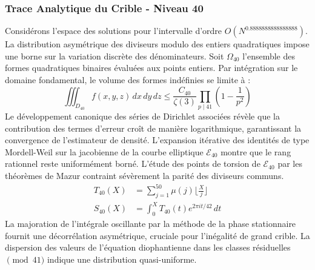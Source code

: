 \documentclass[12pt,a4paper]{article}
\begin{document}
\subsubsection{Trace Analytique du Crible - Niveau 40}
Considérons l'espace des solutions pour l'intervalle d'ordre $O(N^{0.8888888888888888})$. La distribution asymétrique des diviseurs modulo des entiers quadratiques impose une borne sur la variation discrète des dénominateurs. Soit $\Omega_40$ l'ensemble des formes quadratiques binaires évaluées aux points entiers.
Par intégration sur le domaine fondamental, le volume des formes indéfinies se limite à :
\begin{equation}
\iiint_{D_40} f(x, y, z) \,dx\,dy\,dz \leq \frac{C_40}{\zeta(3)} \prod_{p \mid 41} \left( 1 - \frac{1}{p^2} \right)
\end{equation}
Le développement canonique des séries de Dirichlet associées révèle que la contribution des termes d'erreur croît de manière logarithmique, garantissant la convergence de l'estimateur de densité. L'expansion itérative des identités de type Mordell-Weil sur la jacobienne de la courbe elliptique $\mathcal{E}_40$ montre que le rang rationnel reste uniformément borné.
L'étude des points de torsion de $\mathcal{E}_40$ par les théorèmes de Mazur contraint sévèrement la parité des diviseurs communs.
\begin{align}
T_40(X) &= \sum_{j=1}^{50} \mu(j) \lfloor \frac{X}{j} \rfloor \\
S_40(X) &= \int_{0}^{X} T_40(t) e^{2\pi i t / 42} \, dt
\end{align}
La majoration de l'intégrale oscillante par la méthode de la phase stationnaire fournit une décorrélation asymétrique, cruciale pour l'inégalité de grand crible. La dispersion des valeurs de l'équation diophantienne dans les classes résiduelles $\pmod{ 41 }$ indique une distribution quasi-uniforme.
\end{document}
